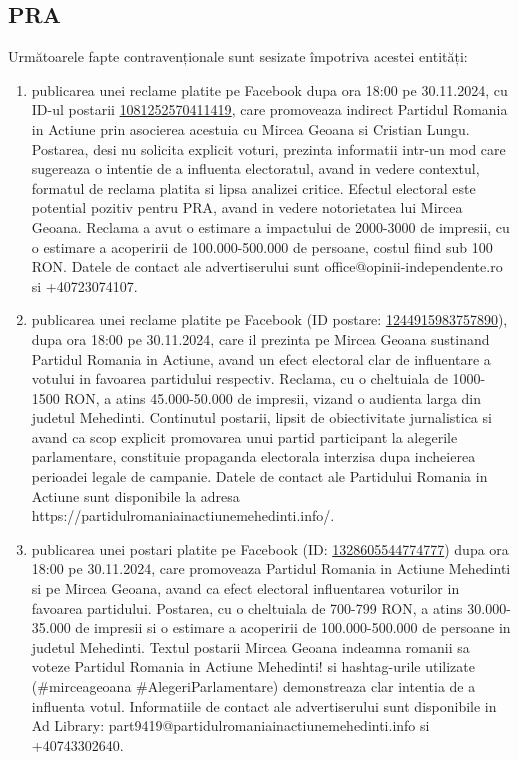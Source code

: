 \documentclass[a4paper,12pt]{article}
\begin{document}
\vspace{0.5cm}

\subsection{PRA}
Următoarele fapte contravenționale sunt sesizate împotriva acestei entități:

\begin{enumerate}[leftmargin=*, label=\arabic*.)]
    \item publicarea unei reclame platite pe Facebook dupa ora 18:00 pe 30.11.2024, cu ID-ul postarii \href{https://www.facebook.com/ads/library/?id=1081252570411419}{1081252570411419}, care promoveaza indirect Partidul Romania in Actiune prin asocierea acestuia cu Mircea Geoana si Cristian Lungu.  Postarea, desi nu solicita explicit voturi, prezinta informatii intr-un mod care sugereaza o intentie de a influenta electoratul, avand in vedere contextul, formatul de reclama platita si lipsa analizei critice.  Efectul electoral este potential pozitiv pentru PRA, avand in vedere notorietatea lui Mircea Geoana.  Reclama a avut o estimare a impactului de 2000-3000 de impresii, cu o estimare a acoperirii de 100.000-500.000 de persoane, costul fiind sub 100 RON.  Datele de contact ale advertiserului sunt office@opinii-independente.ro si +40723074107.
    \item publicarea unei reclame platite pe Facebook (ID postare: \href{https://www.facebook.com/ads/library/?id=1244915983757890}{1244915983757890}), dupa ora 18:00 pe 30.11.2024, care il prezinta pe Mircea Geoana sustinand Partidul Romania in Actiune, avand un efect electoral clar de influentare a votului in favoarea partidului respectiv.  Reclama, cu o cheltuiala de 1000-1500 RON, a atins 45.000-50.000 de impresii, vizand o audienta larga din judetul Mehedinti.  Continutul postarii, lipsit de obiectivitate jurnalistica si avand ca scop explicit promovarea unui partid participant la alegerile parlamentare, constituie propaganda electorala interzisa dupa incheierea perioadei legale de campanie.  Datele de contact ale Partidului Romania in Actiune sunt disponibile la adresa https://partidulromaniainactiunemehedinti.info/.
    \item publicarea unei postari platite pe Facebook (ID: \href{https://www.facebook.com/ads/library/?id=1328605544774777}{1328605544774777}) dupa ora 18:00 pe 30.11.2024, care promoveaza Partidul Romania in Actiune Mehedinti si pe Mircea Geoana, avand ca efect electoral influentarea voturilor in favoarea partidului. Postarea, cu o cheltuiala de 700-799 RON, a atins 30.000-35.000 de impresii si o estimare a acoperirii de 100.000-500.000 de persoane in judetul Mehedinti.  Textul postarii Mircea Geoana indeamna romanii sa voteze Partidul Romania in Actiune Mehedinti! si hashtag-urile utilizate (\#mirceageoana \#AlegeriParlamentare) demonstreaza clar intentia de a influenta votul.  Informatiile de contact ale advertiserului sunt disponibile in Ad Library: part9419@partidulromaniainactiunemehedinti.info si +40743302640.

\end{enumerate}
\end{document}
